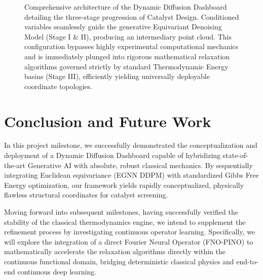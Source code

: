 \documentclass[conference]{IEEEtran}
\begin{document}
\begin{figure}[htbp]
\caption{Comprehensive architecture of the Dynamic Diffusion Dashboard detailing the three-stage progression of Catalyst Design. Conditioned variables seamlessly guide the generative Equivariant Denoising Model (Stage I \& II), producing an intermediary point cloud. This configuration bypasses highly experimental computational mechanics and is immediately plunged into rigorous mathematical relaxation algorithms governed strictly by standard Thermodynamic Energy basins (Stage III), efficiently yielding universally deployable coordinate topologies.}
\label{fig:full_architecture}
\end{figure}

\section{Conclusion and Future Work}
In this project milestone, we successfully demonstrated the conceptualization and deployment of a Dynamic Diffusion Dashboard capable of hybridizing state-of-the-art Generative AI with absolute, robust classical mechanics. By sequentially integrating Euclidean equivariance (EGNN DDPM) with standardized Gibbs Free Energy optimization, our framework yields rapidly conceptualized, physically flawless structural coordinates for catalyst screening. 

Moving forward into subsequent milestones, having successfully verified the stability of the classical thermodynamics engine, we intend to supplement the refinement process by investigating continuous operator learning. Specifically, we will explore the integration of a direct Fourier Neural Operator (FNO-PINO) to mathematically accelerate the relaxation algorithms directly within the continuous functional domain, bridging deterministic classical physics and end-to-end continuous deep learning.
\end{document}
